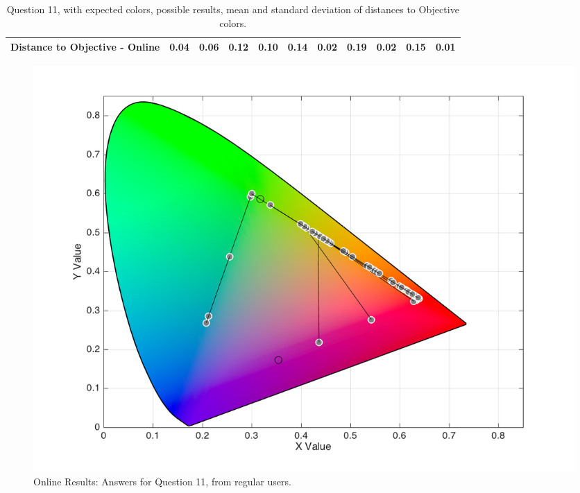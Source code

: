\begin{table}[H]
{\begin{tabular}{lccccccccccccc}
    \multicolumn{4}{l}{Distance to Objective - Online}                                                                                               & \multicolumn{1}{|c}{\textbf{0.04}}        & \multicolumn{1}{c|}{0.06}    & \multicolumn{1}{|c}{0.12}        & \multicolumn{1}{c|}{0.10}    & \multicolumn{1}{|c}{0.14}       & \multicolumn{1}{c|}{0.02}    & \multicolumn{1}{|c}{0.19}        & \multicolumn{1}{c|}{0.02}    & \multicolumn{1}{|c}{0.15}       & \multicolumn{1}{c|}{0.01}    \\ \hline
    \end{tabular}}
  \caption[Question 11, with expected Results.]{Question 11, with expected colors, possible results, mean and standard deviation of distances to Objective colors.}
  \label{table:lab_q11_expected}
\end{table}
%
\begin{figure}[htbp]
  \centering
  \begin{minipage}{0.48\textwidth}
    \centering
    \includegraphics[width=\textwidth]{images/results/11_online_regularUsers.png}
    \caption[Online Results: Answers for Question 11, from regular users.]{Online Results: Answers for Question 11, from regular users.}
    \label{fig:onlineregular_11}
  \end{minipage}\hfill
  \begin{minipage}{0.48\textwidth}
    \centering

\end{minipage}
\end{figure}
